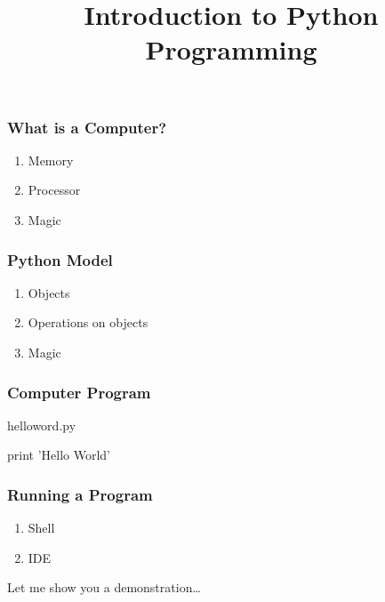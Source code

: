 
\title{Introduction to Python Programming}


\frame{\maketitle}


\begin{frame}[fragile]
\frametitle{What is a Computer?}

\begin{enumerate}
\item Memory
\item Processor
\item Magic
\end{enumerate}
\end{frame}

\begin{frame}[fragile]
\frametitle{Python Model}

\begin{enumerate}
\item Objects
\item Operations on objects
\item Magic
\end{enumerate}
\end{frame}

\begin{frame}[fragile]
\frametitle{Computer Program}

\begin{block}{helloword.py}
\begin{python}
print 'Hello World'
\end{python}
\end{block}
\end{frame}

\begin{frame}[fragile]
\frametitle{Running a Program}
\begin{enumerate}
\item Shell
\item IDE
\end{enumerate}
\end{frame}

\begin{frame}[fragile]

\bigskip
\bigskip
\bigskip
Let me show you a demonstration\ldots



\end{frame}

